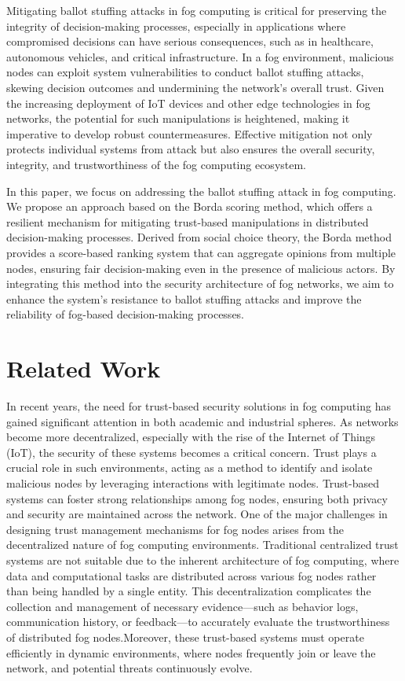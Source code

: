 \documentclass{sn-jnl}%
\begin{document}
Mitigating ballot stuffing attacks in fog computing is critical for preserving the integrity of decision-making processes, especially in applications where compromised decisions can have serious consequences, such as in healthcare, autonomous vehicles, and critical infrastructure. In a fog environment, malicious nodes can exploit system vulnerabilities to conduct ballot stuffing attacks, skewing decision outcomes and undermining the network's overall trust. Given the increasing deployment of IoT devices and other edge technologies in fog networks, the potential for such manipulations is heightened, making it imperative to develop robust countermeasures. Effective mitigation not only protects individual systems from attack but also ensures the overall security, integrity, and trustworthiness of the fog computing ecosystem.

In this paper, we focus on addressing the ballot stuffing attack in fog computing. We propose an approach based on the Borda scoring method, which offers a resilient mechanism for mitigating trust-based manipulations in distributed decision-making processes. Derived from social choice theory, the Borda method provides a score-based ranking system that can aggregate opinions from multiple nodes, ensuring fair decision-making even in the presence of malicious actors. By integrating this method into the security architecture of fog networks, we aim to enhance the system's resistance to ballot stuffing attacks and improve the reliability of fog-based decision-making processes.
\section{Related Work}
In recent years, the need for trust-based security solutions in fog computing has gained significant attention in both academic and industrial spheres. As networks become more decentralized, especially with the rise of the Internet of Things (IoT), the security of these systems becomes a critical concern. Trust plays a crucial role in such environments, acting as a method to identify and isolate malicious nodes by leveraging interactions with legitimate nodes. Trust-based systems can foster strong relationships among fog nodes, ensuring both privacy and security are maintained across the network\cite{wang2013internet}.
One of the major challenges in designing trust management mechanisms for fog nodes arises from the decentralized nature of fog computing environments. Traditional centralized trust systems are not suitable due to the inherent architecture of fog computing, where data and computational tasks are distributed across various fog nodes rather than being handled by a single entity. This decentralization complicates the collection and management of necessary evidence—such as behavior logs, communication history, or feedback—to accurately evaluate the trustworthiness of distributed fog nodes\cite{ni2017securing}.Moreover, these trust-based systems must operate efficiently in dynamic environments, where nodes frequently join or leave the network, and potential threats continuously evolve.
\end{document}
